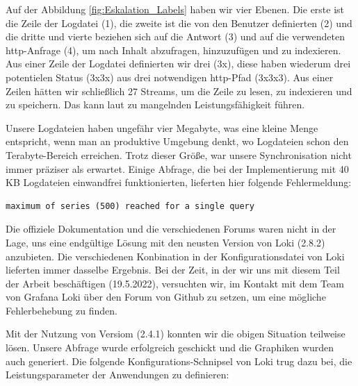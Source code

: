 Auf der Abbildung \ref{fig:Eskalation_Labels} haben wir vier Ebenen. Die erste ist die Zeile der Logdatei (1), die zweite ist die von den Benutzer definierten  (2) und die dritte und vierte beziehen sich auf die Antwort (3) und auf die verwendeten \gls{http}-Anfrage (4), um nach Inhalt abzufragen, hinzuzufügen und zu indexieren. Aus einer Zeile der Logdatei definierten wir drei  (3x), diese haben wiederum drei potentielen Status (3x3x) aus drei notwendigen \gls{http}-Pfad (3x3x3). Aus einer Zeilen hätten wir schließlich 27 Streams, um die Zeile zu lesen, zu indexieren und zu speichern. Das kann laut \cite{Grafana_labels} zu mangelnden Leistungsfähigkeit führen.

Unsere Logdateien haben ungefähr vier Megabyte, was eine kleine Menge entspricht, wenn man an produktive Umgebung denkt, wo Logdateien schon den Terabyte-Bereich erreichen. Trotz dieser Größe, war unsere Synchronisation nicht immer präziser als erwartet. Einige Abfrage, die bei der Implementierung mit 40 KB Logdateien einwandfrei funktionierten, lieferten hier folgende Fehlermeldung:

{
\begin{Verbatim}[fontsize=\small, frame=single]
maximum of series (500) reached for a single query  
\end{Verbatim}
}

Die offiziele Dokumentation und die verschiedenen Forums waren nicht in der Lage, uns eine endgültige Lösung mit den neusten Version von Loki (2.8.2) anzubieten. Die verschiedenen Konbination in der Konfigurationsdatei von Loki lieferten immer dasselbe Ergebnis. Bei der Zeit, in der wir uns mit diesem Teil der Arbeit beschäftigen (19.5.2022), versuchten wir, im Kontakt mit dem Team von Grafana Loki über den Forum von Github zu setzen, um eine mögliche Fehlerbehebung zu finden.

Mit der Nutzung von Versiom (2.4.1) konnten wir die obigen Situation teilweise lösen. Unsere Abfrage wurde erfolgreich geschickt und die Graphiken wurden auch generiert. Die folgende Konfigurations-Schnipsel von Loki trug dazu bei, die Leistungsparameter der Anwendungen zu definieren:


